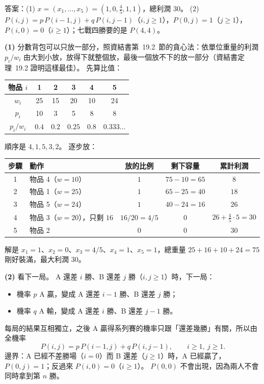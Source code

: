 \begin{pastsoln}
答案：(1) $x = (x_1, \ldots, x_5) = (1, 0, \tfrac{4}{5}, 1, 1)$，總利潤 $30$。
(2) $P(i, j) = p\,P(i-1, j) + q\,P(i, j-1)$（$i, j \ge 1$），$P(0, j) = 1$（$j \ge 1$），
$P(i, 0) = 0$（$i \ge 1$）；七戰四勝要的是 $P(4, 4)$。

\textbf{(1)} 分數背包可以只放一部分，照資結書第~19.2~節的貪心法：依單位重量的利潤 $p_i / w_i$
由大到小放，放得下就整個放，最後一個放不下的放一部分（資結書定理~19.2 證明這樣最佳）。 先算比值：
\begin{center}
\begin{tabular}{cccccc}
\toprule
物品 $i$ & 1 & 2 & 3 & 4 & 5 \\
\midrule
$w_i$ & 25 & 15 & 20 & 10 & 24 \\
$p_i$ & 10 & 3 & 5 & 8 & 8 \\
$p_i / w_i$ & $0.4$ & $0.2$ & $0.25$ & $0.8$ & $0.333\ldots$ \\
\bottomrule
\end{tabular}
\end{center}
順序是 $4, 1, 5, 3, 2$。 逐步放：
\begin{center}
\begin{tabular}{clccc}
\toprule
步驟 & 動作 & 放的比例 & 剩下容量 & 累計利潤 \\
\midrule
1 & 物品 4（$w = 10$） & $1$ & $75 - 10 = 65$ & $8$ \\
2 & 物品 1（$w = 25$） & $1$ & $65 - 25 = 40$ & $18$ \\
3 & 物品 5（$w = 24$） & $1$ & $40 - 24 = 16$ & $26$ \\
4 & 物品 3（$w = 20$），只剩 $16$ & $16/20 = 4/5$ & $0$ & $26 + \tfrac{4}{5} \cdot 5 = 30$ \\
5 & 物品 2 & $0$ & $0$ & $30$ \\
\bottomrule
\end{tabular}
\end{center}
解是 $x_1 = 1$、$x_2 = 0$、$x_3 = 4/5$、$x_4 = 1$、$x_5 = 1$，總重量
$25 + 16 + 10 + 24 = 75$ 剛好裝滿，最大利潤 $30$。

\textbf{(2)} 看下一局。 A 還差 $i$ 勝、B 還差 $j$ 勝（$i, j \ge 1$）時，下一局：
\begin{itemize}
\item 機率 $p$ A 贏，變成 A 還差 $i - 1$ 勝、B 還差 $j$ 勝；
\item 機率 $q$ A 輸，變成 A 還差 $i$ 勝、B 還差 $j - 1$ 勝。
\end{itemize}
每局的結果互相獨立，之後 A 贏得系列賽的機率只跟「還差幾勝」有關，所以由全機率
\[
P(i, j) = p\,P(i - 1, j) + q\,P(i, j - 1), \qquad i \ge 1,\ j \ge 1 .
\]
邊界：A 已經不差勝場（$i = 0$）而 B 還差（$j \ge 1$）時，A 已經贏了，$P(0, j) = 1$；反過來
$P(i, 0) = 0$（$i \ge 1$）。 $P(0, 0)$ 不會出現，因為兩人不會同時拿到第 $n$ 勝。


\end{pastsoln}
